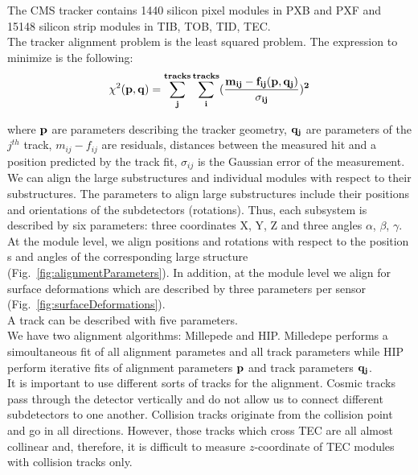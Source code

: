 The CMS tracker contains 1440 silicon pixel modules in PXB and PXF and 15148 silicon strip modules in TIB, TOB, TID, TEC.\\

The tracker alignment problem is the least squared problem. The expression to minimize is the following:\\

\begin{equation}
  \chi^2(\bf{p},\bf{q})=\sum_j^{tracks} \sum_i^{tracks} ({\frac{m_{ij}-f_{ij}(\bf{p},\bf{q_j})}{\sigma_{ij}}})^2
\end{equation}

where $\bf{p}$ are parameters describing the tracker geometry, $\bf{q}_j$ are parameters of the $j^{th}$ track, $m_{ij}-f_{ij}$ are residuals, distances between the measured hit and a position predicted by the track fit, $\sigma_{ij}$ is the Gaussian error of the measurement.\\

We can align the large substructures and individual modules with respect to their substructures. The parameters to align large substructures include their positions and orientations of the subdetectors (rotations). Thus, each subsystem is described by six parameters: three coordinates X, Y, Z and three angles $\alpha$, $\beta$, $\gamma$. At the module level, we align positions and rotations with respect to the position s and angles of the corresponding large structure (Fig.~\ref{fig:alignmentParameters}). In addition, at the module level we align for surface deformations which are described by three parameters per sensor (Fig.~\ref{fig:surfaceDeformations}). \\

A track can be described with five parameters.\\
We have two alignment algorithms: Millepede and HIP. Milledepe performs a simoultaneous fit of all alignment parametes and all track parameters while HIP perform iterative fits of alignment parameters $\bf{p}$ and track parameters $\bf{q}_j$.\\


It is important to use different sorts of tracks for the alignment. Cosmic tracks pass through the detector vertically and do not allow us to connect different subdetectors to one another. Collision tracks originate from the collision point and go in all directions. However, those tracks which cross TEC are all almost collinear and, therefore, it is difficult to measure $z$-coordinate of TEC modules with collision tracks only.\\

